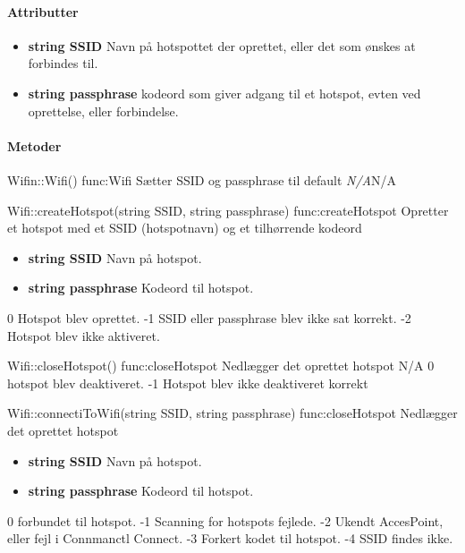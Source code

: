 \paragraph{Attributter}

\begin{itemize}
    \item \textbf{string SSID} Navn på hotspottet  der oprettet, eller det som ønskes at forbindes til.
    \item \textbf{string passphrase} kodeord som giver adgang til et hotspot, evten ved oprettelse, eller forbindelse.
\end{itemize}

\paragraph{Metoder}

\begin{functionDescription}
{Wifin::Wifi()}
{func:Wifi}
{Sætter SSID og passphrase til default}
{\textit{N/A}}{N/A}
\end{functionDescription}

\begin{functionDescription}
{Wifi::createHotspot(string SSID, string passphrase)}
{func:createHotspot}
{Opretter et hotspot med et SSID (hotspotnavn) og et tilhørrende kodeord}
{{\begin{itemize}
    \item \textbf{string SSID} Navn på hotspot.
    \item \textbf{string passphrase} Kodeord til hotspot. 
\end{itemize}}}
{0 Hotspot blev oprettet. -1 SSID eller passphrase blev ikke sat korrekt. -2 Hotspot blev ikke aktiveret.}
\end{functionDescription}


\begin{functionDescription}
{Wifi::closeHotspot()}
{func:closeHotspot}
{Nedlægger det oprettet hotspot}
{N/A}
{0 hotspot blev deaktiveret. -1 Hotspot blev ikke deaktiveret korrekt}
\end{functionDescription}

\begin{functionDescription}
{Wifi::connectiToWifi(string SSID, string passphrase)}
{func:closeHotspot}
{Nedlægger det oprettet hotspot}
{{\begin{itemize}
    \item \textbf{string SSID} Navn på hotspot.
    \item \textbf{string passphrase} Kodeord til hotspot. 
\end{itemize}}}
{0 forbundet til hotspot. -1 Scanning for hotspots fejlede. -2 Ukendt AccesPoint, eller fejl i Connmanctl Connect. -3 Forkert kodet til hotspot. -4 SSID findes ikke.}
\end{functionDescription}


